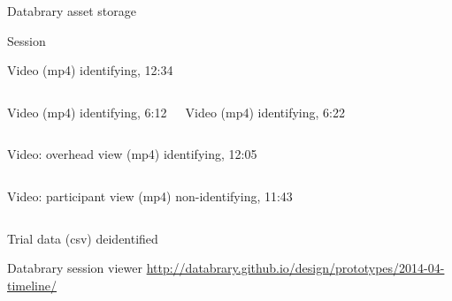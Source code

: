 \documentclass[aspectratio=169,14pt]{beamer}
\begin{document}
\begin{frame}{Databrary asset storage}
	\begin{block}{Session}
	\end{block}

	\vspace{-1em}
	\begin{overprint}
	\begin{block}{Video (mp4)}
		identifying, 12:34
	\end{block}

	\begin{columns}
	\begin{block}{Video (mp4)}
		identifying, 6:12
	\end{block}
	\begin{block}{Video (mp4)}
		identifying, 6:22
	\end{block}
	\end{columns}

	\onslide<3>
	\begin{columns}
	\column{0.8\textwidth}
	\begin{block}{Video: overhead view (mp4)}
		identifying, 12:05
	\end{block}
	\column{0.1\textwidth}
	\end{columns}
	\begin{columns}
	\column{0.1\textwidth}
	\begin{block}{Video: participant view (mp4)}
		non-identifying, 11:43
	\end{block}
	\end{columns}

	\end{overprint}

	\begin{block}{Trial data (csv)}
		deidentified
	\end{block}

\end{frame}

\begin{frame}{Databrary session viewer}
	\url{http://databrary.github.io/design/prototypes/2014-04-timeline/}
\end{frame}
\end{document}
